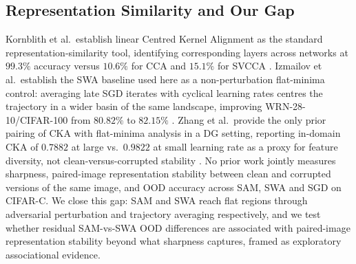 \subsection{Representation Similarity and Our Gap}

Kornblith et al.\ establish linear Centred Kernel Alignment as the standard representation-similarity tool, identifying corresponding layers across networks at $99.3\%$ accuracy versus $10.6\%$ for CCA and $15.1\%$ for SVCCA \cite{kornblith2019_similarity_neural}.
Izmailov et al.\ establish the SWA baseline used here as a non-perturbation flat-minima control: averaging late SGD iterates with cyclical learning rates centres the trajectory in a wider basin of the same landscape, improving WRN-28-10/CIFAR-100 from $80.82\%$ to $82.15\%$ \cite{izmailov2018_averaging_weights}.
Zhang et al.\ provide the only prior pairing of CKA with flat-minima analysis in a DG setting, reporting in-domain CKA of $0.7882$ at large vs.\ $0.9822$ at small learning rate as a proxy for feature diversity, not clean-versus-corrupted stability \cite{zhang2023_exploring_flat}.
No prior work jointly measures sharpness, paired-image representation stability between clean and corrupted versions of the same image, and OOD accuracy across SAM, SWA and SGD on CIFAR-C. We close this gap: SAM and SWA reach flat regions through adversarial perturbation and trajectory averaging respectively, and we test whether residual SAM-vs-SWA OOD differences are associated with paired-image representation stability beyond what sharpness captures, framed as exploratory associational evidence.
